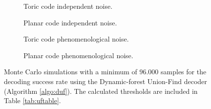 \begin{figure}[htbp]
  \centering
  \begin{subfigure}[b]{0.49\textwidth}
      \begin{adjustbox}{Clip=0 1em 0 0}
        
      \end{adjustbox}
      \caption{Toric code independent noise.}
  \end{subfigure}
  \begin{subfigure}[b]{0.49\textwidth}
      \begin{adjustbox}{Clip=0 1em 0 0}
        
      \end{adjustbox}
      \caption{Planar code independent noise.}
  \end{subfigure}
  \begin{subfigure}[b]{0.49\textwidth}
      \begin{adjustbox}{Clip=0 1em 0 0}
        
      \end{adjustbox}
      \caption{Toric code phenomenological noise.}
  \end{subfigure}
  \begin{subfigure}[b]{0.49\textwidth}
      \begin{adjustbox}{Clip=0 1em 0 0}
        
      \end{adjustbox}
      \caption{Planar code phenomenological noise.}
  \end{subfigure}
  \caption{Monte Carlo simulations with a minimum of $96.000$ samples for the decoding success rate using the Dynamic-forest Union-Find decoder (Algorithm \ref{algo:duf}). The calculated thresholds are included in Table \ref{tab:uftable}.}
  \label{fig:threshold_duf}
\end{figure}

